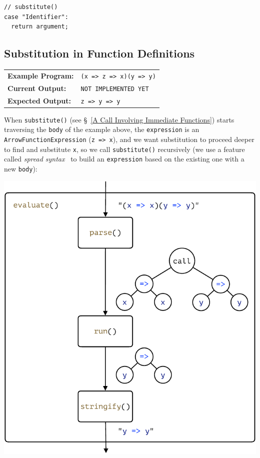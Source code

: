 \documentclass[12pt, oneside]{book}
\begin{document}
\begin{verbatim}
// substitute()
case "Identifier":
  return argument;
\end{verbatim}

\subsection{Substitution in Function Definitions}
\label{Substitution in Function Definitions}

\begin{center}
\begin{tabular}{ll}
\textbf{Example Program:} & \texttt{(x => z => x)(y => y)} \\
\textbf{Current Output:} & \texttt{NOT IMPLEMENTED YET} \\
\textbf{Expected Output:} & \texttt{z => y => y} \\
\end{tabular}
\end{center}

When \texttt{substitute()} (see §~\ref{A Call Involving Immediate Functions}) starts traversing the \texttt{body} of the example above, the \texttt{expression} is an \texttt{ArrowFunctionExpression} (\texttt{z => x}), and we want substitution to proceed deeper to find and substitute \texttt{x}, so we call \texttt{substitute()} recursively (we use a feature called \emph{spread syntax}~\cite{spread-syntax} to build an \texttt{expression} based on the existing one with a new \texttt{body}):

\begin{center}
\includegraphics[page = 6]{images.pdf}
\end{center}
\end{document}
